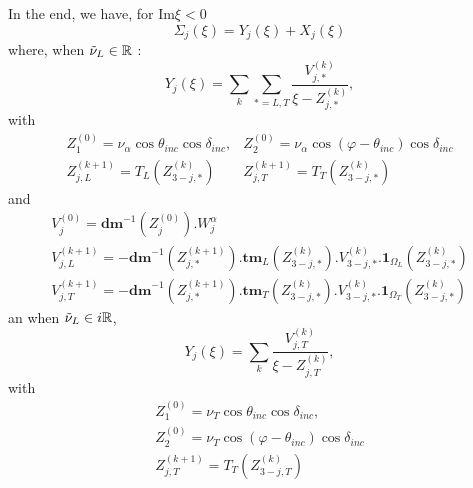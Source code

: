 In the end, we have, for  $\mbox{Im} \xi <0$
\begin{equation}
\Sigma_j(\xi)=Y_j(\xi)+X_j(\xi) \label{C4:decomp}
\end{equation}
where, when $\tilde{\nu}_L \in \mathbb{R}$ :
\begin{equation}
Y_j(\xi)=\sum_k \sum_{*=L,T} \frac{V_{j,*}^{(k)}}{\xi-Z_{j,*}^{(k)}}
\label{C4:yj},
\end{equation}
with
\begin{equation}
\begin{matrix}
Z_{1}^{(0)}=\nu_{\alpha} \cos \theta_{inc}\cos\delta_{inc},  & Z_{2}^{(0)}=\nu_{\alpha} \cos(\varphi-\theta_{inc})\cos\delta_{inc} \\
Z_{j,L}^{(k+1)}= T_L(Z_{3-j,*}^{(k)}) &Z_{j,T}^{(k+1)}= T_T(Z_{3-j,*}^{(k)}) 
\end{matrix}
\label{C4:poles}
\end{equation}
and
\begin{equation}
\begin{matrix}
V_{j}^{(0)}=\textbf{dm}^{-1}(Z_{j}^{(0)}).W_j^{\alpha}\\
V_{j,L}^{(k+1)}=-\textbf{dm}^{-1}(Z_{j,*}^{(k+1)}).\textbf{tm}_L(Z_{3-j,*}^{(k)}).V_{3-j,*}^{(k)}.\textbf{1}_{\Omega_L}(Z_{3-j,*}^{(k)}) \\ 
V_{j,T}^{(k+1)}=-\textbf{dm}^{-1}(Z_{j,*}^{(k+1)}).\textbf{tm}_T(Z_{3-j,*}^{(k)}).V_{3-j,*}^{(k)}.\textbf{1}_{\Omega_T}(Z_{3-j,*}^{(k)}) 
\end{matrix}
\label{C4:residus}
\end{equation}
an when $\tilde{\nu}_L \in i\mathbb{R}$,
\begin{equation}
Y_j(\xi)=\sum_k \frac{V_{j,T}^{(k)}}{\xi-Z_{j,T}^{(k)}}
\label{C4:yjcr},
\end{equation}
with
\begin{equation}
\begin{matrix}
Z_{1}^{(0)}=\nu_T \cos \theta_{inc}\cos\delta_{inc},\\ 
Z_{2}^{(0)}=\nu_T \cos(\varphi-\theta_{inc})\cos\delta_{inc}\\
Z_{j,T}^{(k+1)}= T_T(Z_{3-j,T}^{(k)}) 
\end{matrix}
\label{C4:polescr}
\end{equation}
